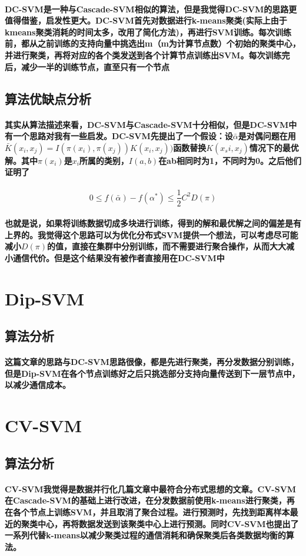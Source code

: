 \documentclass[UTF8]{ctexart}
\begin{document}
\paragraph{
    DC-SVM是一种与Cascade-SVM相似的算法，但是我觉得DC-SVM的思路更值得借鉴，启发性更大。DC-SVM首先对数据进行k-means聚类(实际上由于kmeans聚类消耗的时间太多，改用了简化方法)，再进行SVM训练。每次训练前，都从之前训练的支持向量中挑选出m（m为计算节点数）个初始的聚类中心，并进行聚类，再将对应的各个类发送到各个计算节点训练出SVM。每次训练完后，减少一半的训练节点，直至只有一个节点
}
\subsection{算法优缺点分析}
\paragraph{
    其实从算法描述来看，DC-SVM与Cascade-SVM十分相似，但是DC-SVM中有一个思路对我有一些启发。DC-SVM先提出了一个假设：设$\bar{\alpha}$是对偶问题在用$\bar{K}(x_i,x_j)=I(\pi(x_i),\pi(x_j))K(x_i,x_j))$函数替换$K(x_si,x_j)$情况下的最优解。其中$\pi(x_i)$是$x_i$所属的类别，$I(a,b)$在ab相同时为1，不同时为0。之后他们证明了
}
\[0 \leq f(\bar{\alpha})-f(\alpha^*) \leq \frac{1}{2}C^2D(\pi)\]
\paragraph{
    也就是说，如果将训练数据切成多块进行训练，得到的解和最优解之间的偏差是有上界的。我觉得这个思路可以为优化分布式SVM提供一个想法，可以考虑尽可能减小$D(\pi)$的值，直接在集群中分别训练，而不需要进行聚合操作，从而大大减小通信代价。但是这个结果没有被作者直接用在DC-SVM中
}
\section{Dip-SVM}
\subsection{算法分析}
\paragraph{
    这篇文章的思路与DC-SVM思路很像，都是先进行聚类，再分发数据分别训练，但是Dip-SVM在各个节点训练好之后只挑选部分支持向量传送到下一层节点中，以减少通信成本。
}

\section{CV-SVM}
\subsection{算法分析}
\paragraph{
    CV-SVM我觉得是数据并行化几篇文章中最符合分布式思想的文章。CV-SVM在Cascade-SVM的基础上进行改进，在分发数据前使用k-means进行聚类，再在各个节点上训练SVM，并且取消了聚合过程。进行预测时，先找到距离样本最近的聚类中心，再将数据发送到该聚类中心上进行预测。同时CV-SVM也提出了一系列代替k-means以减少聚类过程的通信消耗和确保聚类后各类数据均衡的算法。
}
\end{document}
